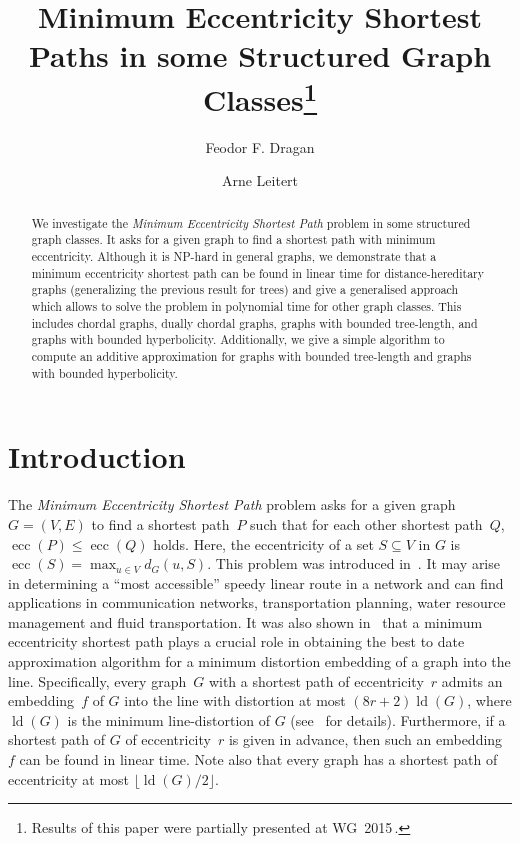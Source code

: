 \documentclass[10pt]{llncs}
\title
{Minimum Eccentricity Shortest Paths in some Structured Graph Classes\thanks
    {Results of this paper were partially presented at WG~2015\,\cite{DraganLeiter2015}.
    }
}
\author
{Feodor F. Dragan 
    \and 
    Arne Leitert
}
\institute{
    Department of Computer Science, \\
    Kent State University, Kent, Ohio, USA  \\
    \email{dragan@cs.kent.edu}, 
    \email{aleitert@cs.kent.edu} 
}
\DeclareMathOperator{\ld}{ld}
\DeclareMathOperator{\ecc}{ecc}
\begin{document}
\pagestyle{plain}
\maketitle

\begin{abstract}
We investigate the \emph{Minimum Eccentricity Shortest Path} problem in some structured graph classes. 
It asks for a given graph to find a shortest path with minimum eccentricity. 
Although it is NP-hard in general graphs, we demonstrate that a minimum eccentricity shortest path can be found in linear time for distance-hereditary graphs (generalizing the previous result for trees) and give a generalised approach which allows to solve the problem in polynomial time for other graph classes.
This includes chordal graphs, dually chordal graphs, graphs with bounded tree-length, and graphs with bounded hyperbolicity.
Additionally, we give a simple algorithm to compute an additive approximation for graphs with bounded tree-length and graphs with bounded hyperbolicity.
\end{abstract}

\section{Introduction}

The \emph{Minimum Eccentricity Shortest Path} problem asks for a given graph $G=(V,E)$ to find a shortest path~$P$ such that for each other shortest path~$Q$, $\ecc(P) \leq \ecc(Q)$ holds.
Here, the eccentricity of a set $S\subseteq V$ in $G$ is $\ecc(S)=\max_{u \in V} d_G(u, S)$.
This problem was introduced in~\cite{DrLei2015}.
It may arise in determining a ``most accessible'' speedy linear route in a network  and can find applications in communication networks, transportation planning, water resource management and fluid transportation.
It was also shown in~\cite{DKL2014,DrLei2015} that a minimum eccentricity shortest path plays a crucial role in obtaining the best to date approximation algorithm for a minimum distortion embedding of a graph into the line.
Specifically, every graph~$G$ with a shortest path of eccentricity~$r$ admits an embedding~$f$ of $G$ into the line with distortion at most $(8r +  2) \ld(G)$, where $\ld(G)$ is the minimum line-distortion of $G$ (see~\cite{DrLei2015} for details).
Furthermore, if a shortest path of $G$ of eccentricity~$r$ is given in advance, then such an embedding~$f$ can be found in linear time.
Note also that every graph has a shortest path of eccentricity at most $\lfloor \ld(G) / 2 \rfloor$.
\end{document}
